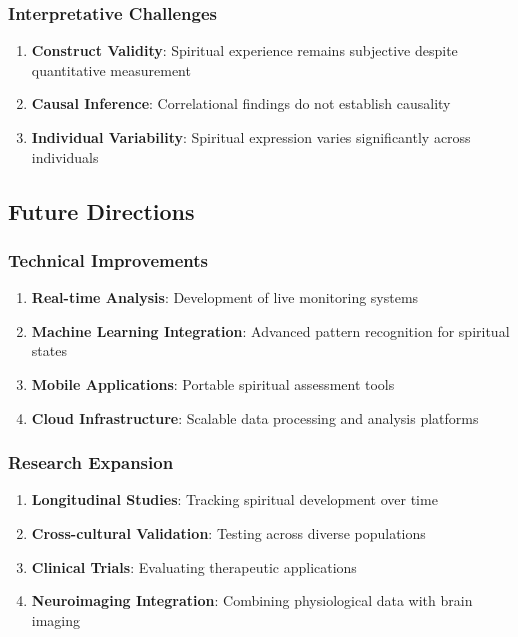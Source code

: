 \documentclass[12pt,a4paper]{article}
\begin{document}
\subsubsection{Interpretative Challenges}

\begin{enumerate}
    \item \textbf{Construct Validity}: Spiritual experience remains subjective despite quantitative measurement
    \item \textbf{Causal Inference}: Correlational findings do not establish causality
    \item \textbf{Individual Variability}: Spiritual expression varies significantly across individuals
\end{enumerate}

\subsection{Future Directions}

\subsubsection{Technical Improvements}

\begin{enumerate}
    \item \textbf{Real-time Analysis}: Development of live monitoring systems
    \item \textbf{Machine Learning Integration}: Advanced pattern recognition for spiritual states
    \item \textbf{Mobile Applications}: Portable spiritual assessment tools
    \item \textbf{Cloud Infrastructure}: Scalable data processing and analysis platforms
\end{enumerate}

\subsubsection{Research Expansion}

\begin{enumerate}
    \item \textbf{Longitudinal Studies}: Tracking spiritual development over time
    \item \textbf{Cross-cultural Validation}: Testing across diverse populations
    \item \textbf{Clinical Trials}: Evaluating therapeutic applications
    \item \textbf{Neuroimaging Integration}: Combining physiological data with brain imaging
\end{enumerate}
\end{document}
